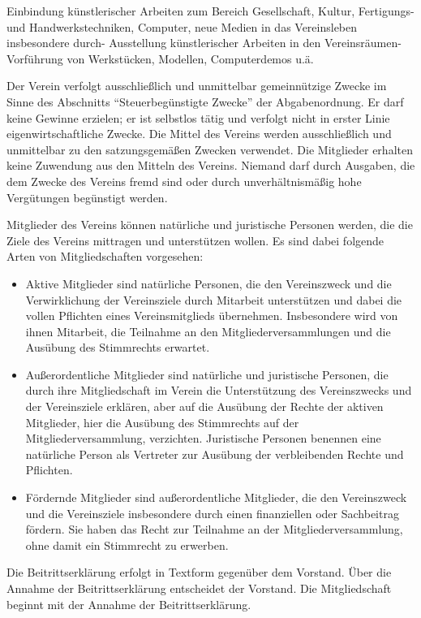 \documentclass[12pt,ngerman]{scrartcl}
\begin{document}
\begin{contract}
Einbindung künstlerischer Arbeiten zum Bereich Gesellschaft, Kultur, Fertigungs- und Handwerkstechniken, Computer, neue Medien in das Vereinsleben insbesondere durch- Ausstellung künstlerischer Arbeiten in den Vereinsräumen- Vorführung von Werkstücken, Modellen, Computerdemos u.ä.

Der Verein verfolgt ausschließlich und unmittelbar gemeinnützige Zwecke im Sinne des Abschnitts \enquote{Steuerbegünstigte Zwecke} der Abgabenordnung. Er darf keine Gewinne erzielen; er ist selbstlos tätig und verfolgt nicht in erster Linie eigenwirtschaftliche Zwecke. Die Mittel des Vereins werden ausschließlich und unmittelbar zu den satzungsgemäßen Zwecken verwendet. Die Mitglieder erhalten keine Zuwendung aus den Mitteln des Vereins. Niemand darf durch Ausgaben, die dem Zwecke des Vereins fremd sind oder durch unverhältnismäßig hohe Vergütungen begünstigt werden.



Mitglieder des Vereins können natürliche und juristische Personen werden, die die Ziele des Vereins mittragen und unterstützen wollen. Es sind dabei folgende Arten von Mitgliedschaften vorgesehen:

\begin{itemize}
	\item Aktive Mitglieder sind natürliche Personen, die den Vereinszweck und die Verwirklichung der Vereinsziele durch Mitarbeit unterstützen und dabei die vollen Pflichten eines Vereinsmitglieds übernehmen. Insbesondere wird von ihnen Mitarbeit, die Teilnahme an den Mitgliederversammlungen und die Ausübung des Stimmrechts erwartet.
	\item Außerordentliche Mitglieder sind natürliche und juristische Personen, die durch ihre Mitgliedschaft im Verein die Unterstützung des Vereinszwecks und der Vereinsziele erklären, aber auf die Ausübung der Rechte der aktiven Mitglieder, hier die Ausübung des Stimmrechts auf der Mitgliederversammlung, verzichten. Juristische Personen benennen eine natürliche Person als Vertreter zur Ausübung der verbleibenden Rechte und Pflichten.
	\item Fördernde Mitglieder sind außerordentliche Mitglieder, die den Vereinszweck und die Vereinsziele insbesondere durch einen finanziellen oder Sachbeitrag fördern. Sie haben das Recht zur Teilnahme an der Mitgliederversammlung, ohne damit ein Stimmrecht zu erwerben.
\end{itemize}

Die Beitrittserklärung erfolgt in Textform gegenüber dem Vorstand. Über die Annahme der Beitrittserklärung entscheidet der Vorstand. Die Mitgliedschaft beginnt mit der Annahme der Beitrittserklärung.


\end{contract}
\end{document}
